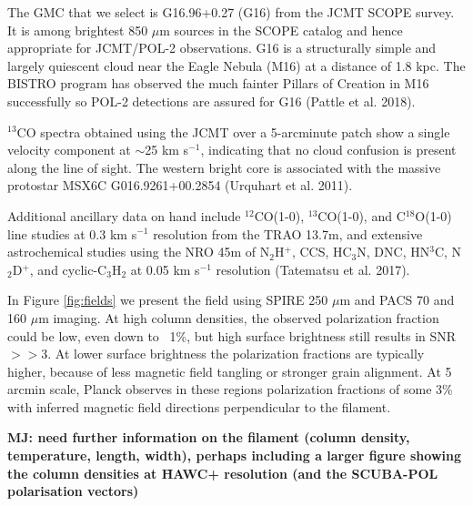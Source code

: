 \documentclass[11pt]{amsart}
\begin{document}
{The GMC that we select is G16.96+0.27 (G16) from the JCMT SCOPE survey. It is among brightest 850 $\mu$m sources in the SCOPE catalog and hence appropriate for JCMT/POL-2 observations. G16 is a structurally simple and largely quiescent cloud near the Eagle Nebula (M16) at a distance of 1.8 kpc. 
The BISTRO program has observed the much fainter Pillars of Creation in M16 successfully so POL-2 detections are assured for G16 (Pattle et al. 2018).

$^{13}$CO spectra 
obtained using the JCMT over a 5-arcminute patch
show a single velocity component at  $\sim$25 km s$^{-1}$, indicating that no cloud confusion is present along the line of sight. The western bright core is associated with the massive protostar MSX6C G016.9261+00.2854 (Urquhart et al. 2011).


Additional ancillary data on hand include $^{12}$CO(1-0), $^{13}$CO(1-0), and C$^{18}$O(1-0) line studies at 0.3 km s$^{-1}$ resolution from the TRAO 13.7m, 
and extensive astrochemical studies using the NRO 45m of N$_2$H$^+$, CCS, HC$_3$N, DNC, HN$^3$C, N$_2$D$^+$, and cyclic-C$_3$H$_2$ at 
0.05 km s$^{-1}$ resolution (Tatematsu et al. 2017).

In Figure \ref{fig:fields} we present the field using SPIRE 250 $\mu$m and PACS 70 and 160 $\mu$m imaging. At high column densities, the observed polarization fraction could be low, even down to ~1\%, but high surface brightness still results in SNR$>>$3. At lower surface brightness the polarization fractions are typically higher, because of less magnetic field tangling or stronger grain alignment. At 5 arcmin scale, Planck observes in these regions polarization fractions of some 3\%
with inferred magnetic field directions perpendicular to the filament.

{\bf MJ: need further information on the filament (column density, temperature, length, width), perhaps including a larger figure showing the column densities at \~HAWC+ resolution (and the SCUBA-POL polarisation vectors)
}



\clearpage

}
\end{document}
